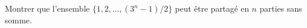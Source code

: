 Montrer que l'ensemble $\{1, 2, \ldots, (3^n - 1)/2\}$ peut être partagé en $n$ parties sans somme.
